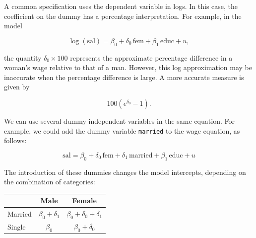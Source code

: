 \vspace{10pt}

A common specification uses the dependent variable in logs. In this case, the coefficient on the dummy has a percentage interpretation. For example, in the model 

\vspace{10pt}

\[
\log(\text{sal}) = \beta_0 + \delta_0 \,\text{fem} + \beta_1 \,\text{educ} + u,
\]

\vspace{10pt}

the quantity $\delta_0 \times 100$ represents the approximate percentage difference in a woman's wage relative to that of a man. However, this log approximation may be inaccurate when the percentage difference is large. A more accurate measure is given by

\vspace{10pt}

\[
100 \left(e^{\delta_0} - 1\right).
\]

\vspace{10pt}

We can use several dummy independent variables in the same equation. For example, we could add the dummy variable \texttt{married} to the wage equation, as follows:

\vspace{10pt}

\[
    \text{sal} = \beta_0 + \delta_0 \,\text{fem} + \delta_1 \,\text{married} + \beta_1 \,\text{educ} + u
\]

\vspace{10pt}

The introduction of these dummies changes the model intercepts, depending on the combination of categories:

\vspace{10pt}

\begin{center}
\begin{tabular}{|l|c|c|}
    \hline
    & Male & Female \\
    \hline
    Married & $\beta_0 + \delta_1$ & $\beta_0 + \delta_0 + \delta_1$ \\
    \hline
    Single & $\beta_0$ & $\beta_0 + \delta_0$ \\
    \hline
\end{tabular}
\end{center}

\vspace{10pt}


